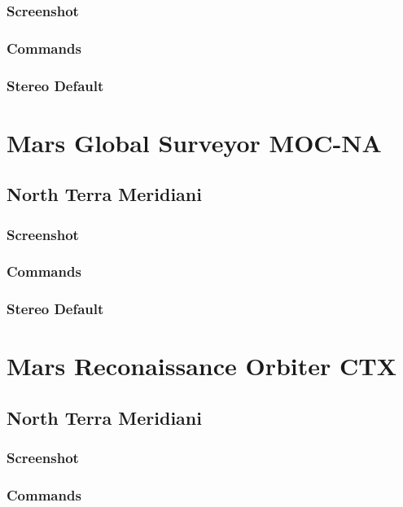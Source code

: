 \subsubsection*{Screenshot}

\subsubsection*{Commands}

\subsubsection*{Stereo Default}

\section{Mars Global Surveyor MOC-NA}

\subsection{North Terra Meridiani}

\subsubsection*{Screenshot}

\subsubsection*{Commands}

\subsubsection*{Stereo Default}

\section{Mars Reconaissance Orbiter CTX}

\subsection{North Terra Meridiani}

\subsubsection*{Screenshot}

\subsubsection*{Commands}

